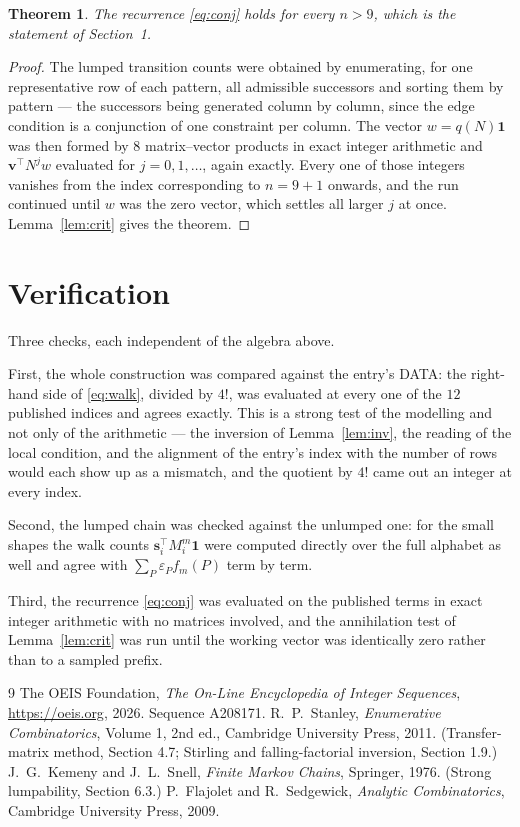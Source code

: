 \documentclass[11pt,a4paper]{article}
\theoremstyle{plain}
\newtheorem{theorem}{Theorem}
\theoremstyle{definition}
\begin{document}
\begin{theorem}
The recurrence \eqref{eq:conj} holds for every $n>9$, which is the statement of
Section~1.
\end{theorem}

\begin{proof}
The lumped transition counts were obtained by enumerating, for one representative row of
each pattern, all admissible successors and sorting them by pattern --- the successors being
generated column by column, since the edge condition is a conjunction of one constraint per
column. The vector $w=q(N)\mathbf{1}$ was then formed by $8$ matrix--vector products
in exact integer arithmetic and $\mathbf{v}^{\!\top}N^{j}w$ evaluated for
$j=0,1,\dots$, again exactly. Every one of those integers vanishes from the index
corresponding to $n=9+1$ onwards, and the run continued until $w$ was the zero vector,
which settles all larger $j$ at once. Lemma~\ref{lem:crit} gives the theorem.
\end{proof}

\section{Verification}

Three checks, each independent of the algebra above.

First, the whole construction was compared against the entry's DATA: the right-hand side of
\eqref{eq:walk}, divided by $4!$, was evaluated at every one of the $12$
published indices and agrees exactly. This is a strong test of the modelling and not only of
the arithmetic --- the inversion of Lemma~\ref{lem:inv}, the reading of the local
condition, and the alignment of the entry's index with the number of rows would each
show up as a mismatch, and the quotient by $4!$ came out an integer at every index.

Second, the lumped chain was checked against the unlumped one: for the small shapes the walk
counts $\mathbf{s}_i^{\!\top}M_i^{m}\mathbf{1}$ were computed directly over the full
alphabet as well and agree with $\sum_P\varepsilon_Pf_m(P)$ term by term.

Third, the recurrence \eqref{eq:conj} was evaluated on the published terms in exact integer
arithmetic with no matrices involved, and the annihilation test of Lemma~\ref{lem:crit} was
run until the working vector was identically zero rather than to a sampled prefix.

\begin{thebibliography}{9}
 The OEIS Foundation, \emph{The On-Line Encyclopedia of Integer
Sequences}, \url{https://oeis.org}, 2026. Sequence A208171.
 R.~P.~Stanley, \emph{Enumerative Combinatorics}, Volume 1, 2nd ed.,
Cambridge University Press, 2011. (Transfer-matrix method, Section 4.7; Stirling and
falling-factorial inversion, Section 1.9.)
 J.~G.~Kemeny and J.~L.~Snell, \emph{Finite Markov Chains}, Springer,
1976. (Strong lumpability, Section 6.3.)
 P.~Flajolet and R.~Sedgewick, \emph{Analytic Combinatorics}, Cambridge
University Press, 2009.
\end{thebibliography}
\end{document}

